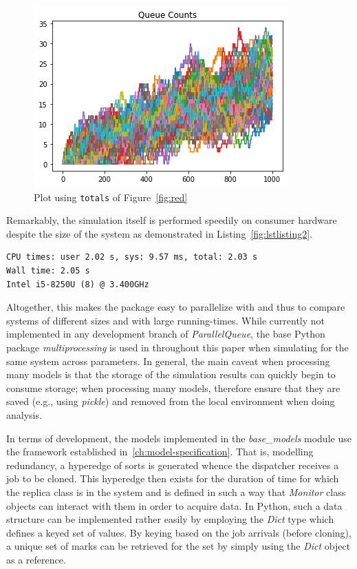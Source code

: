 \begin{figure}
    \centering
    \includegraphics[scale=0.8]{redundancy}
    \caption{Plot using \lstinline{totals} of Figure~\ref{fig:red}}
    \label{fig:redpic}
\end{figure}

Remarkably, the simulation itself is performed speedily on consumer hardware despite the size of the system as demonstrated in Listing~\ref{fig:lstlisting2}.
    \begin{lstlisting}[label={fig:lstlisting2},style=mystyle, caption={Runtime Statistics Using the Master ParallelQueue Branch}]
CPU times: user 2.02 s, sys: 9.57 ms, total: 2.03 s
Wall time: 2.05 s
Intel i5-8250U (8) @ 3.400GHz
    \end{lstlisting}


Altogether, this makes the package easy to parallelize with and thus to compare systems of different sizes
and with large running-times.
While currently not implemented in any development branch of \textit{ParallelQueue}, the base Python package
\textit{multiprocessing} is used in throughout this paper when simulating for the same system across parameters.
In general, the main caveat when processing many models is that the storage of the simulation results can quickly begin
to consume storage;
when processing many models, therefore ensure that they are saved (e.g., using \textit{pickle}) and removed from
the local environment when doing analysis.

In terms of development, the models implemented in the \textit{base\_models} module use the framework established in~\ref{ch:model-specification}.
That is, modelling redundancy, a hyperedge of sorts is generated whence the dispatcher
receives a job to be cloned.
This hyperedge then exists for the duration of time for which the replica class is in the system and is defined in such
a way that \textit{Monitor} class objects can interact with them in order to acquire data.
In Python, such a data structure can be implemented rather easily by employing the \textit{Dict} type which defines
a keyed set of values.
By keying based on the job arrivals (before cloning), a unique set of marks can be retrieved for the set by simply using
the \textit{Dict} object as a reference.

